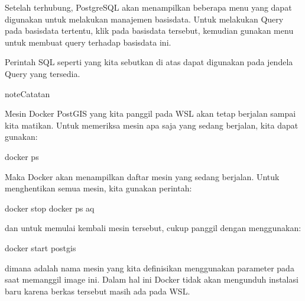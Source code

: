 \documentclass[letterpaper,10pt,english]{sphinxmanual}
\begin{document}
Setelah terhubung, PostgreSQL akan menampilkan beberapa menu yang dapat digunakan untuk melakukan manajemen basisdata. Untuk melakukan Query pada basisdata tertentu, klik pada basisdata tersebut, kemudian gunakan menu  untuk membuat query terhadap basisdata ini.


Perintah SQL seperti yang kita sebutkan di atas dapat digunakan pada jendela Query yang tersedia.


\begin{sphinxadmonition}{note}{Catatan}

Mesin Docker PostGIS yang kita panggil pada WSL akan tetap berjalan sampai kita matikan. Untuk memeriksa mesin apa saja yang sedang berjalan, kita dapat gunakan:

\begin{sphinxVerbatim}[commandchars=\\\{\}]
docker ps
\end{sphinxVerbatim}
\end{sphinxadmonition}

Maka Docker akan menampilkan daftar mesin yang sedang berjalan. Untuk menghentikan semua mesin, kita gunakan perintah:

\begin{sphinxVerbatim}[commandchars=\\\{\}]
docker stop docker ps \PYGZhy{}aq
\end{sphinxVerbatim}

dan untuk memulai kembali mesin tersebut, cukup panggil dengan menggunakan:

\begin{sphinxVerbatim}[commandchars=\\\{\}]
docker start postgis
\end{sphinxVerbatim}

dimana  adalah nama mesin yang kita definisikan menggunakan parameter  pada saat memanggil image ini. Dalam hal ini Docker tidak akan mengunduh instalasi baru karena berkas tersebut masih ada pada WSL.

\begin{sphinxVerbatim}[commandchars=\\\{\}]














\end{sphinxVerbatim}
\end{document}
